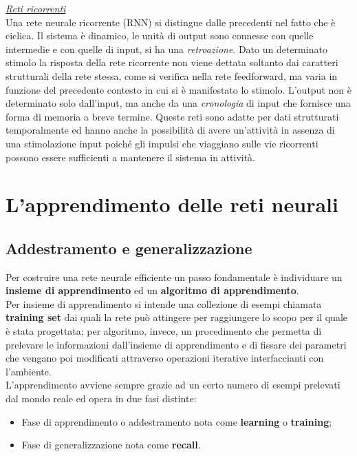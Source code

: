 \documentclass[12pt,a4paper,oneside]{book}
\begin{document}
		\underline{\emph{Reti ricorrenti}}\\
		Una rete neurale ricorrente (RNN) si distingue dalle precedenti nel fatto che è ciclica. Il sistema è dinamico, le unità di output sono connesse con quelle intermedie e con quelle di input, si ha una \emph{retroazione}. Dato un determinato stimolo la risposta della rete ricorrente non viene dettata soltanto dai caratteri strutturali della rete stessa, come si verifica nella rete feedforward, ma varia in funzione del precedente contesto in cui si è manifestato lo stimolo. L'output non è determinato solo dall'input, ma anche da una \emph{cronologia} di input che fornisce una forma di memoria a breve termine. Queste reti sono adatte per dati strutturati temporalmente ed hanno anche la possibilità di avere un’attività in assenza di una stimolazione input poiché gli impulsi che viaggiano sulle vie ricorrenti possono essere sufficienti a mantenere il sistema in attività.
	

	
	\chapter{L'apprendimento delle reti neurali}
	
	
	
	\section{Addestramento e generalizzazione}
		
		Per costruire una rete neurale efficiente un passo fondamentale è individuare un \textbf{insieme di apprendimento} ed un \textbf{algoritmo di apprendimento}.\\
		Per insieme di apprendimento si intende una collezione di esempi chiamata \textbf{training set} dai quali la rete può attingere per raggiungere lo scopo per il quale è stata progettata; per algoritmo, invece, un procedimento che permetta di prelevare le informazioni dall'insieme di apprendimento e di fissare dei parametri che vengano poi modificati attraverso operazioni iterative interfaccianti con l'ambiente.\\
		L’apprendimento avviene sempre grazie ad un certo numero di esempi prelevati dal mondo reale ed opera in due fasi distinte: 
		
		\begin{itemize}
			\item Fase di apprendimento o addestramento nota come \textbf{learning} o \textbf{training};\\
			\item Fase di generalizzazione nota come \textbf{recall}.
		\end{itemize} 
		
\end{document}
